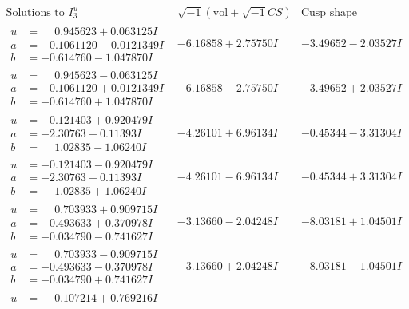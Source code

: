 \documentclass[1p]{elsarticle_modified}
\theoremstyle{definition}
\newcommand{\I}{\sqrt{-1}}
\begin{document}
$$\begin{array}{c|c|c}  
\text{Solutions to }I^u_{3}& \I (\text{vol} + \sqrt{-1}CS) & \text{Cusp shape}\\
 \hline 
\begin{aligned}
u &= \phantom{-}0.945623 + 0.063125 I \\
a &= -0.1061120 - 0.0121349 I \\
b &= -0.614760 - 1.047870 I\end{aligned}
 & -6.16858 + 2.75750 I & -3.49652 - 2.03527 I \\ \hline\begin{aligned}
u &= \phantom{-}0.945623 - 0.063125 I \\
a &= -0.1061120 + 0.0121349 I \\
b &= -0.614760 + 1.047870 I\end{aligned}
 & -6.16858 - 2.75750 I & -3.49652 + 2.03527 I \\ \hline\begin{aligned}
u &= -0.121403 + 0.920479 I \\
a &= -2.30763 + 0.11393 I \\
b &= \phantom{-}1.02835 - 1.06240 I\end{aligned}
 & -4.26101 + 6.96134 I & -0.45344 - 3.31304 I \\ \hline\begin{aligned}
u &= -0.121403 - 0.920479 I \\
a &= -2.30763 - 0.11393 I \\
b &= \phantom{-}1.02835 + 1.06240 I\end{aligned}
 & -4.26101 - 6.96134 I & -0.45344 + 3.31304 I \\ \hline\begin{aligned}
u &= \phantom{-}0.703933 + 0.909715 I \\
a &= -0.493633 + 0.370978 I \\
b &= -0.034790 - 0.741627 I\end{aligned}
 & -3.13660 - 2.04248 I & -8.03181 + 1.04501 I \\ \hline\begin{aligned}
u &= \phantom{-}0.703933 - 0.909715 I \\
a &= -0.493633 - 0.370978 I \\
b &= -0.034790 + 0.741627 I\end{aligned}
 & -3.13660 + 2.04248 I & -8.03181 - 1.04501 I \\ \hline\begin{aligned}
u &= \phantom{-}0.107214 + 0.769216 I \\

\end{aligned}
\end{array}$$
\end{document}
